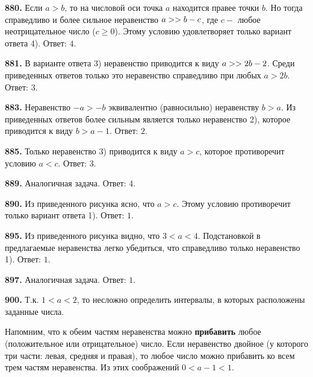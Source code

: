 \textbf{880.} Если $a>b$, то на числовой оси точка $a$ находится правее точки $b$. Но тогда  справедливо и более сильное неравенство $a>\linebreak>b-c$, где $c-$ любое неотрицательное число ($c\geq0$). Этому условию удовлетворяет  только вариант ответа 4). \newline \null \hspace*{\fill} Ответ: $4$.

\textbf{881.} В варианте ответа 3) неравенство приводится к виду $a>\linebreak>2b-2$. Среди приведенных ответов только это неравенство справедливо при  любых $a>2b$. \newline \null \hspace*{\fill} Ответ: $3$.

\textbf{883.} Неравенство $-a>-b$ эквивалентно (равносильно) неравенству $b>a$. Из приведенных ответов  более сильным является только неравенство 2), которое приводится к виду $b>a-1$. \newline \null \hspace*{\fill} Ответ: $2$. 

\textbf{885.} Только неравенство 3) приводится к виду $a>c$, которое противоречит условию $a<c$. \newline \null \hspace*{\fill} Ответ: $3$. 

\textbf{889.} Аналогичная задача. \newline \null \hspace*{\fill} Ответ: $4$. 

\textbf{890.} Из приведенного рисунка ясно, что $a>c$. Этому условию противоречит только вариант ответа 1). \newline \null \hspace*{\fill} Ответ: $1$. 

\textbf{895.} Из приведенного рисунка видно, что $3<a<4$. Подстановкой в предлагаемые неравенства легко убедиться, что справедливо только неравенство 1). \newline \null \hspace*{\fill} Ответ: $1$.

\textbf{897.} Аналогичная задача. \newline \null \hspace*{\fill} Ответ: $1$. 

\textbf{900.} Т.к. $1<a<2$, то несложно определить интервалы, в которых расположены заданные числа.  

Напомним, что к обеим частям  неравенства можно \textbf{прибавить} любое (положительное или отрицательное) число. Если неравенство двойное (у которого три части: левая, средняя и правая), то любое число можно прибавить ко всем трем частям неравенства. Из этих соображений $0<a-1<1$.

